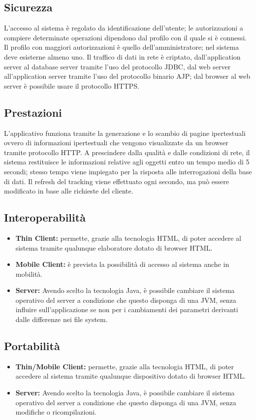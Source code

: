 \documentclass[a4paper,12pt]{article}
\begin{document}
\subsection{Sicurezza}
L'accesso al sistema è regolato da identificazione dell'utente; le autorizzazioni a compiere determinate operazioni dipendono dal profilo con il quale si è connessi. Il profilo con maggiori autorizzazioni è quello dell’amministratore; nel sistema deve esisterne almeno uno.
Il traffico di dati in rete è criptato, dall’application server al database server tramite l’uso del protocollo JDBC, dal web server all’application server tramite l’uso del protocollo binario AJP; dal browser al web server è possibile usare il protocollo HTTPS.
\subsection{Prestazioni}
L’applicativo funziona tramite la generazione e lo scambio di pagine ipertestuali ovvero di informazioni ipertestuali che vengono visualizzate da un browser tramite protocollo HTTP. A prescindere dalla qualità e dalle condizioni di rete, il sistema restituisce le informazioni relative agli oggetti entro un tempo medio di 5 secondi; stesso tempo viene impiegato per la risposta alle interrogazioni della base di dati. Il refresh del tracking viene effettuato ogni secondo, ma può essere modificato in base alle richieste del cliente.
\pagebreak
\subsection{Interoperabilità}
\begin{itemize}
\item \textbf{Thin Client:} permette, grazie alla tecnologia HTML, di poter accedere al sistema tramite qualunque elaboratore dotato di browser HTML.
\item \textbf{Mobile Client:} è prevista la possibilità di accesso al sistema anche in mobilità.
\item \textbf{Server:} Avendo scelto la tecnologia Java, è possibile cambiare il sistema operativo del server a condizione che questo disponga di una JVM, senza influire sull'applicazione se non per i cambiamenti dei parametri derivanti dalle differenze nei file system.
\end{itemize}
\subsection{Portabilità}
\begin{itemize}
\item \textbf{Thin/Mobile Client:} permette, grazie alla tecnologia HTML, di poter accedere al sistema tramite qualunque dispositivo dotato di browser HTML.
\item \textbf{Server:} Avendo scelto la tecnologia Java, è possibile cambiare il sistema operativo del server a condizione che questo disponga di una JVM, senza modifiche o ricompilazioni.
\end{itemize}
\end{document}
